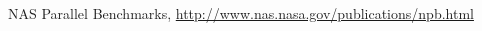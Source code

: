 \documentclass[conference,compsoc]{IEEEtran}
\begin{document}












%
%
%


\begin{thebibliography}{1}

NAS Parallel Benchmarks, \url{http://www.nas.nasa.gov/publications/npb.html}

\end{thebibliography}

\appendix 
\end{document}
